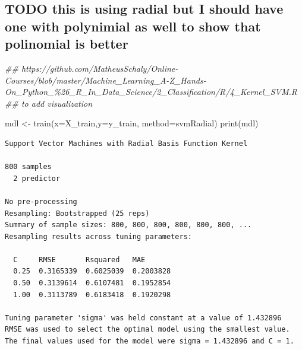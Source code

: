 \documentclass[
  letterpaper,
  DIV=11,
  numbers=noendperiod]{scrartcl}
\newenvironment{Shaded}{\begin{snugshade}}{\end{snugshade}}
\newcommand{\AttributeTok}[1]{\textcolor[rgb]{0.40,0.45,0.13}{#1}}
\newcommand{\DocumentationTok}[1]{\textcolor[rgb]{0.37,0.37,0.37}{\textit{#1}}}
\newcommand{\FunctionTok}[1]{\textcolor[rgb]{0.28,0.35,0.67}{#1}}
\newcommand{\NormalTok}[1]{\textcolor[rgb]{0.00,0.23,0.31}{#1}}
\newcommand{\OtherTok}[1]{\textcolor[rgb]{0.00,0.23,0.31}{#1}}
\newcommand{\StringTok}[1]{\textcolor[rgb]{0.13,0.47,0.30}{#1}}
\begin{document}
\hypertarget{todo-this-is-using-radial-but-i-should-have-one-with-polynimial-as-well-to-show-that-polinomial-is-better}{%
\subsection{TODO this is using radial but I should have one with
polynimial as well to show that polinomial is
better}\label{todo-this-is-using-radial-but-i-should-have-one-with-polynimial-as-well-to-show-that-polinomial-is-better}}

\begin{Shaded}
\begin{Highlighting}[]
\DocumentationTok{\#\# https://github.com/MatheusSchaly/Online{-}Courses/blob/master/Machine\_Learning\_A{-}Z\_Hands{-}On\_Python\_\%26\_R\_In\_Data\_Science/2\_Classification/R/4\_Kernel\_SVM.R}
\DocumentationTok{\#\# to add visualization}

\NormalTok{mdl }\OtherTok{\textless{}{-}} \FunctionTok{train}\NormalTok{(}\AttributeTok{x=}\NormalTok{X\_train,}\AttributeTok{y=}\NormalTok{y\_train, }\AttributeTok{method=}\StringTok{\textquotesingle{}svmRadial\textquotesingle{}}\NormalTok{) }
\FunctionTok{print}\NormalTok{(mdl)}
\end{Highlighting}
\end{Shaded}

\begin{verbatim}
Support Vector Machines with Radial Basis Function Kernel 

800 samples
  2 predictor

No pre-processing
Resampling: Bootstrapped (25 reps) 
Summary of sample sizes: 800, 800, 800, 800, 800, 800, ... 
Resampling results across tuning parameters:

  C     RMSE       Rsquared   MAE      
  0.25  0.3165339  0.6025039  0.2003828
  0.50  0.3139614  0.6107481  0.1952854
  1.00  0.3113789  0.6183418  0.1920298

Tuning parameter 'sigma' was held constant at a value of 1.432896
RMSE was used to select the optimal model using the smallest value.
The final values used for the model were sigma = 1.432896 and C = 1.
\end{verbatim}
\end{document}
